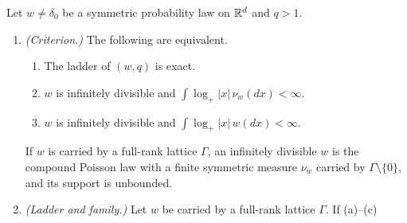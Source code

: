 \begin{proposition}
\label{prop:exact-masks}
\leanok
Let $w \ne \delta_0$ be a symmetric probability law on $\mathbb{R}^d$ and $q > 1$.
\begin{enumerate}
\item \emph{(Criterion.)} The following are equivalent.
\begin{enumerate}
\item[(a)] The ladder of $(w, q)$ is exact.
\item[(b)] $w$ is infinitely divisible and $\int\log_+|x|\,\nu_w(dx) < \infty$.
\item[(c)] $w$ is infinitely divisible and $\int\log_+|x|\,w(dx) < \infty$.
\end{enumerate}
If $w$ is carried by a full-rank lattice $\Gamma$, an infinitely divisible $w$ is the compound
Poisson law with a finite symmetric \Levy{} measure $\nu_w$ carried by $\Gamma \setminus \{0\}$, and
its support is unbounded.
\item \emph{(Ladder and family.)} Let $w$ be carried by a full-rank lattice $\Gamma$. If (a)--(c)

\end{enumerate}
\end{proposition}
